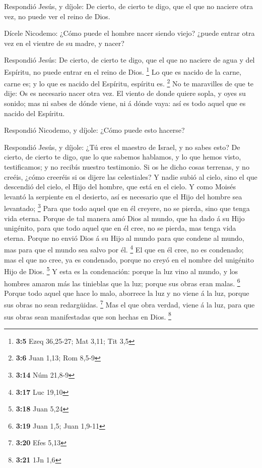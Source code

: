  Respondió Jesús, y díjole: De cierto, de cierto te digo,
que el que no naciere otra vez, no puede ver el reino de Dios.

 Dícele Nicodemo: ¿Cómo puede el hombre nacer siendo
viejo? ¿puede entrar otra vez en el vientre de su madre, y nacer?

 Respondió Jesús: De cierto, de cierto te digo, que el que
no naciere de agua y del Espíritu, no puede entrar en el reino de Dios.
\footnote{\textbf{3:5} Ezeq 36,25-27; Mat 3,11; Tit 3,5} 
Lo que es nacido de la carne, carne es; y lo que es nacido del Espíritu,
espíritu es. \footnote{\textbf{3:6} Juan 1,13; Rom 8,5-9} 
No te maravilles de que te dije: Os es necesario nacer otra vez.
 El viento de donde quiere sopla, y oyes su sonido; mas ni
sabes de dónde viene, ni á dónde vaya: así es todo aquel que es nacido
del Espíritu.

 Respondió Nicodemo, y díjole: ¿Cómo puede esto hacerse?

 Respondió Jesús, y díjole: ¿Tú eres el maestro de
Israel, y no sabes esto?  De cierto, de cierto te digo,
que lo que sabemos hablamos, y lo que hemos visto, testificamos; y no
recibís nuestro testimonio.  Si os he dicho cosas
terrenas, y no creéis, ¿cómo creeréis si os dijere las celestiales?
 Y nadie subió al cielo, sino el que descendió del cielo,
el Hijo del hombre, que está en el cielo.  Y como Moisés
levantó la serpiente en el desierto, así es necesario que el Hijo del
hombre sea levantado; \footnote{\textbf{3:14} Núm 21,8-9}
 Para que todo aquel que en él creyere, no se pierda,
sino que tenga vida eterna.  Porque de tal manera amó
Dios al mundo, que ha dado á su Hijo unigénito, para que todo aquel que
en él cree, no se pierda, mas tenga vida eterna.  Porque
no envió Dios á su Hijo al mundo para que condene al mundo, mas para que
el mundo sea salvo por él. \footnote{\textbf{3:17} Luc 19,10}
 El que en él cree, no es condenado; mas el que no cree,
ya es condenado, porque no creyó en el nombre del unigénito Hijo de
Dios. \footnote{\textbf{3:18} Juan 5,24}  Y esta es la
condenación: porque la luz vino al mundo, y los hombres amaron más las
tinieblas que la luz; porque sus obras eran malas. \footnote{\textbf{3:19}
  Juan 1,5; Juan 1,9-11}  Porque todo aquel que hace lo
malo, aborrece la luz y no viene á la luz, porque sus obras no sean
redargüidas. \footnote{\textbf{3:20} Efes 5,13}  Mas el
que obra verdad, viene á la luz, para que sus obras sean manifestadas
que son hechas en Dios. \footnote{\textbf{3:21} 1Jn 1,6}

